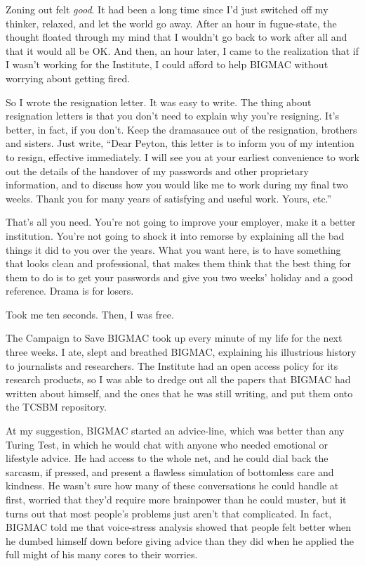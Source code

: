 Zoning out felt \emph{good}. It had been a long time since I'd just 
switched off my thinker, relaxed, and let the world go away. After an 
hour in fugue-state, the thought floated through my mind that I 
wouldn't go back to work after all and that it would all be OK. And 
then, an hour later, I came to the realization that if I wasn't working 
for the Institute, I could afford to help BIGMAC without worrying about 
getting fired.

So I wrote the resignation letter. It was easy to write. The thing 
about resignation letters is that you don't need to explain why you're 
resigning. It's better, in fact, if you don't. Keep the dramasauce out 
of the resignation, brothers and sisters. Just write, “Dear Peyton, 
this letter is to inform you of my intention to resign, effective 
immediately. I will see you at your earliest convenience to work out 
the details of the handover of my passwords and other proprietary 
information, and to discuss how you would like me to work during my 
final two weeks. Thank you for many years of satisfying and useful 
work. Yours, etc.”

That's all you need. You're not going to improve your employer, make it 
a better institution. You're not going to shock it into remorse by 
explaining all the bad things it did to you over the years. What you 
want here, is to have something that looks clean and professional, that 
makes them think that the best thing for them to do is to get your 
passwords and give you two weeks' holiday and a good reference. Drama 
is for losers.

Took me ten seconds. Then, I was free.

\tb

The Campaign to Save BIGMAC took up every minute of my life for the 
next three weeks. I ate, slept and breathed BIGMAC, explaining his 
illustrious history to journalists and researchers. The Institute had 
an open access policy for its research products, so I was able to 
dredge out all the papers that BIGMAC had written about himself, and 
the ones that he was still writing, and put them onto the TCSBM 
repository.

At my suggestion, BIGMAC started an advice-line, which was better than 
any Turing Test, in which he would chat with anyone who needed 
emotional or lifestyle advice. He had access to the whole net, and he 
could dial back the sarcasm, if pressed, and present a flawless 
simulation of bottomless care and kindness. He wasn't sure how many of 
these conversations he could handle at first, worried that they'd 
require more brainpower than he could muster, but it turns out that 
most people's problems just aren't that complicated. In fact, BIGMAC 
told me that voice-stress analysis showed that people felt better when 
he dumbed himself down before giving advice than they did when he 
applied the full might of his many cores to their worries.

